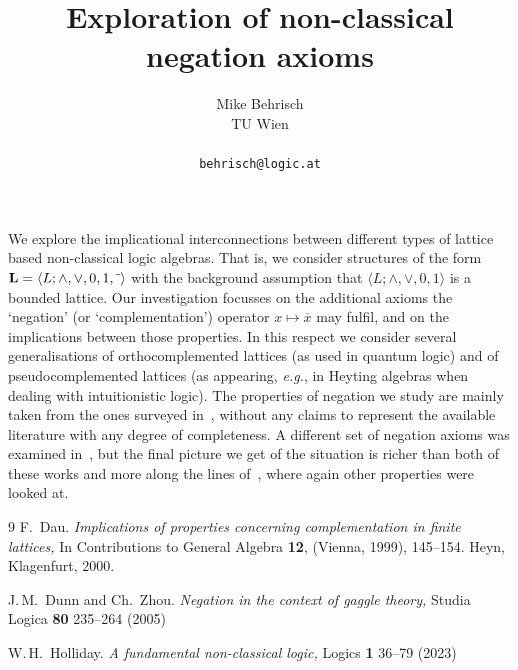 \documentclass[a4paper]{article} %
\date{} %
\begin{document}
\setcounter{page}{1} %

\title{Exploration of non-classical negation axioms}

\author{Mike Behrisch\\
        TU Wien\\ \\ 
       \texttt{behrisch@logic.at}
       }%

\maketitle

We explore the implicational interconnections between different types
of lattice based non-classical logic algebras. That is, we consider
structures of the form
$\mathbf{L} = \langle L; \wedge, \vee, 0,1, \overline{\rule{0pt}{1ex}~}\rangle$ with
the background assumption that $\langle L; \wedge,\vee,0,1\rangle$ is a
bounded lattice.
Our investigation focusses on the additional
axioms the `negation' (or `complementation') operator
$x\mapsto\overline{x}$ may fulfil, and on the implications between those
properties. In this respect we consider several generalisations of
orthocomplemented lattices (as used in quantum logic) and of
pseudocomplemented lattices (as appearing, \emph{e.g.}, in Heyting
algebras when dealing with intuitionistic logic).
The properties of negation we study are mainly taken from the ones
surveyed in~\cite{HollidayAFundamentalNonClassicalLogic2023}, without
any claims to represent the available literature with any degree of
completeness. A different set of negation axioms was examined
in~\cite{DunnZhouNegationInTheContextOfGaggleTheory}, but the final
picture we get of the situation is richer than both of these works and
more along the lines
of~\cite{DauImplicationsComplementationPropertiesFiniteLattices}, where
again other properties were looked at.

\begin{thebibliography}{9}
F.~Dau.
\newblock \emph{Implications of properties concerning complementation in finite lattices,}
\newblock In Contributions to General Algebra \textbf{12}, ({V}ienna, 1999), 145--154.
          Heyn, Klagenfurt, 2000.

J.\,M.~Dunn and Ch.~Zhou.
\newblock \emph{Negation in the context of gaggle theory,}
\newblock Studia Logica \textbf{80} 235--264 (2005)
\newblock {}

W.\,H.~Holliday.
\newblock \emph{A fundamental non-classical logic,}
\newblock Logics \textbf{1} 36--79 (2023)
\newblock {}
\end{thebibliography}
\end{document}
